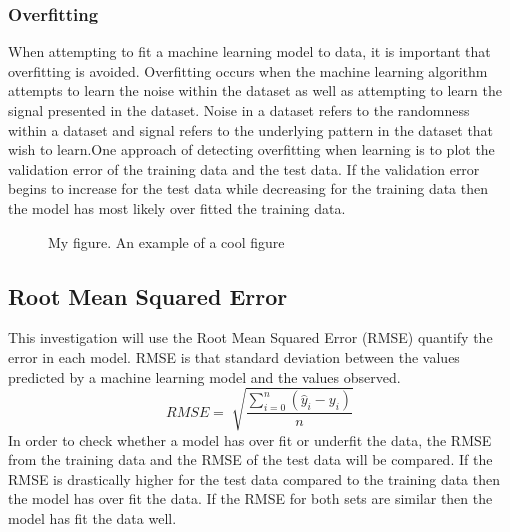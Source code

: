 \documentclass[a4paper,11pt,twoside]{article}
\begin{document}
 \subsubsection{Overfitting}
When attempting to fit a machine learning model to data, it is important that overfitting is avoided. Overfitting occurs when the machine learning algorithm attempts to learn the noise within the dataset as well as attempting to learn the signal presented in the dataset. Noise in a dataset refers to the randomness within a dataset and signal refers to the underlying pattern in the dataset that wish to learn.One approach of detecting overfitting when learning is to plot the validation error of the training data and the test data. If the validation error begins to increase for the test data while decreasing for the training data then the model has most likely over fitted the training data. 

      \begin{figure}[!htb]
        \caption{\label{fig:my-label} My figure.  An example of a cool figure}
      \end{figure}

\subsection{Root Mean Squared Error}
This investigation will use the Root Mean Squared Error (RMSE) quantify the error in each model. RMSE is that standard deviation between the values predicted by a machine learning model and the values observed.
\begin{equation}
RMSE = \sqrt[]{\frac{\sum_{i=0}^{n}(\hat{y}_{i} - y_{i})}{n}}
\end{equation}
In order to check whether a model has over fit or underfit the data, the RMSE from the training data and the RMSE of the test data will be compared. If the RMSE is drastically higher for the test data compared to the training data then the model has over fit the data. If the RMSE for both sets are similar then the model has fit the data well. 
\end{document}
